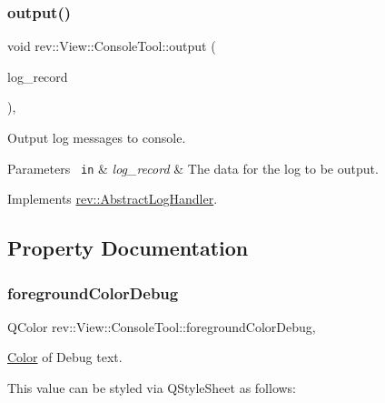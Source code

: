 \subsubsection{\texorpdfstring{output()}{output()}}
{\footnotesize\ttfamily void rev\+::\+View\+::\+Console\+Tool\+::output (\begin{DoxyParamCaption}\item[{\mbox{\hyperlink{classrev_1_1_log_record}{rev\+::\+Log\+Record}} \&}]{log\+\_\+record }\end{DoxyParamCaption})\hspace{0.3cm}{\ttfamily [override]}, {\ttfamily [virtual]}}



Output log messages to console. 


\begin{DoxyParams}[1]{Parameters}
\mbox{\texttt{ in}}  & {\em log\+\_\+record} & The data for the log to be output. \\
\hline
\end{DoxyParams}


Implements \mbox{\hyperlink{classrev_1_1_abstract_log_handler_a0154255c9435f0ee66975be2d450b177}{rev\+::\+Abstract\+Log\+Handler}}.



\subsection{Property Documentation}
\mbox{\label{classrev_1_1_view_1_1_console_tool_a29f7e03610399e9597e9af055408e40b}} 
\subsubsection{\texorpdfstring{foregroundColorDebug}{foregroundColorDebug}}
{\footnotesize\ttfamily Q\+Color rev\+::\+View\+::\+Console\+Tool\+::foreground\+Color\+Debug\hspace{0.3cm}{\ttfamily [read]}, {\ttfamily [write]}}



\mbox{\hyperlink{classrev_1_1_color}{Color}} of Debug text. 

This value can be styled via Q\+Style\+Sheet as follows\+: 
\begin{DoxyCode}{0}
\end{DoxyCode}
 \mbox{\label{classrev_1_1_view_1_1_console_tool_a920e3766992555ec588137994e85bec1}} 
